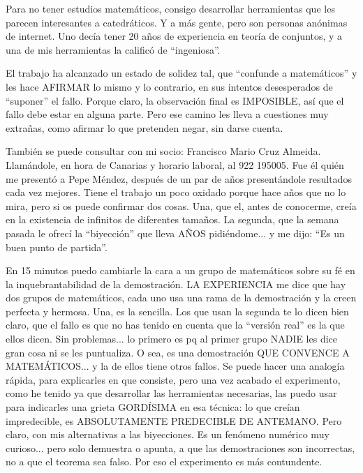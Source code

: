 \noindent
Para no tener estudios matemáticos, consigo desarrollar herramientas que les parecen interesantes a catedráticos. Y a más gente, pero son personas anónimas de internet. Uno decía tener 20 años de experiencia en teoría de conjuntos, y a una de mis herramientas la calificó de ``ingeniosa''.

\noindent
El trabajo ha alcanzado un estado de solidez tal, que ``confunde a matemáticos'' y les hace AFIRMAR lo mismo y lo contrario, en sus intentos desesperados de ``suponer'' el fallo. Porque claro, la observación final es IMPOSIBLE, así que el fallo debe estar en alguna parte. Pero ese camino les lleva a cuestiones muy extrañas, como afirmar lo que pretenden negar, sin darse cuenta.


\noindent
También se puede consultar con mi socio: Francisco Mario Cruz Almeida. Llamándole, en hora de Canarias y horario laboral, al 922 195005. Fue él quién me presentó a Pepe Méndez, después de un par de años presentándole resultados cada vez mejores. Tiene el trabajo un poco oxidado porque hace años que no lo mira, pero si os puede confirmar dos cosas. Una, que el, antes de conocerme, creía en la existencia de infinitos de diferentes tamaños. La segunda, que la semana pasada le ofrecí la ``biyección'' que lleva AÑOS pidiéndome... y me dijo: ``Es un buen punto de partida''.

\noindent
En 15 minutos puedo cambiarle la cara a un grupo de matemáticos sobre su fé en la inquebrantabilidad de la demostración. LA EXPERIENCIA me dice que hay dos grupos de matemáticos, cada uno usa una rama de la demostración y la creen perfecta y hermosa. Una, es la sencilla. Los que usan la segunda te lo dicen bien claro, que el fallo es que no has tenido en cuenta que la ``versión real'' es la que ellos dicen. Sin problemas... lo primero es pq al primer grupo NADIE les dice gran cosa ni se les puntualiza. O sea, es una demostración QUE CONVENCE A MATEMÁTICOS... y la de ellos tiene otros fallos. Se puede hacer una analogía rápida, para explicarles en que consiste, pero una vez acabado el experimento, como he tenido ya que desarrollar las herramientas necesarias, las puedo usar para indicarles una grieta GORDÍSIMA en esa técnica: lo que creían impredecible, es ABSOLUTAMENTE PREDECIBLE DE ANTEMANO. Pero claro, con mis alternativas a las biyecciones. Es un fenómeno numérico muy curioso... pero solo demuestra o apunta, a que las demostraciones son incorrectas, no a que el teorema sea falso. Por eso el experimento es más contundente.



